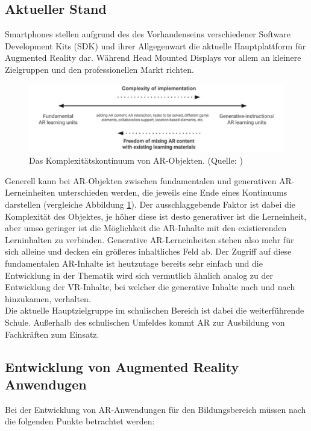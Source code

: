 \subsection{Aktueller Stand}
Smartphones stellen aufgrund des des Vorhandenseins verschiedener Software Development Kits (SDK) und ihrer Allgegenwart die aktuelle Hauptplattform für Augmented Reality dar. Während Head Mounted Displays vor allem an kleinere Zielgruppen und den professionellen Markt richten. \citep[Kapitel 1.2]{geroimenko:ar-in-education}\\
\begin{figure}
\centering
\includegraphics[width=1.0\textwidth]{Abbildungen/ar-object-continuum.png}
\caption[Komplexitätskontinuum von AR-Objekten]{Das Komplexitätskontinuum von AR-Objekten. (Quelle: \cite[S. 9]{geroimenko:ar-in-education})}
\label{fig:komplexitätskontinuum}
\end{figure}
Generell kann bei AR-Objekten zwischen fundamentalen und generativen AR-Lerneinheiten unterschieden werden, die jeweils eine Ende eines Kontinuums darstellen (vergleiche Abbildung \ref{fig:komplexitätskontinuum}).
Der ausschlaggebende Faktor ist dabei die Komplexität des Objektes, je höher diese ist desto generativer ist die Lerneinheit, aber umso geringer ist die Möglichkeit die AR-Inhalte mit den existierenden Lerninhalten zu verbinden. 
Generative AR-Lerneinheiten stehen also mehr für sich alleine und decken ein größeres inhaltliches Feld ab.
Der Zugriff auf diese fundamentalen AR-Inhalte ist heutzutage bereits sehr einfach und die Entwicklung in der Thematik wird sich vermutlich ähnlich analog zu der Entwicklung der VR-Inhalte, bei welcher die generative Inhalte nach und nach hinzukamen, verhalten.\citep[Kapitel 1.3]{geroimenko:ar-in-education}\\
Die aktuelle Hauptzielgruppe im schulischen Bereich ist dabei die weiterführende Schule. Außerhalb des schulischen Umfeldes kommt AR zur Ausbildung von Fachkräften zum Einsatz. \citep[Kapitel 1.5]{geroimenko:ar-in-education}

\subsection{Entwicklung von Augmented Reality Anwendugen}
Bei der Entwicklung von AR-Anwendungen für den Bildungsbereich müssen nach \citeauthor[Kapitel 1.7]{geroimenko:ar-in-education} die folgenden Punkte betrachtet werden:
